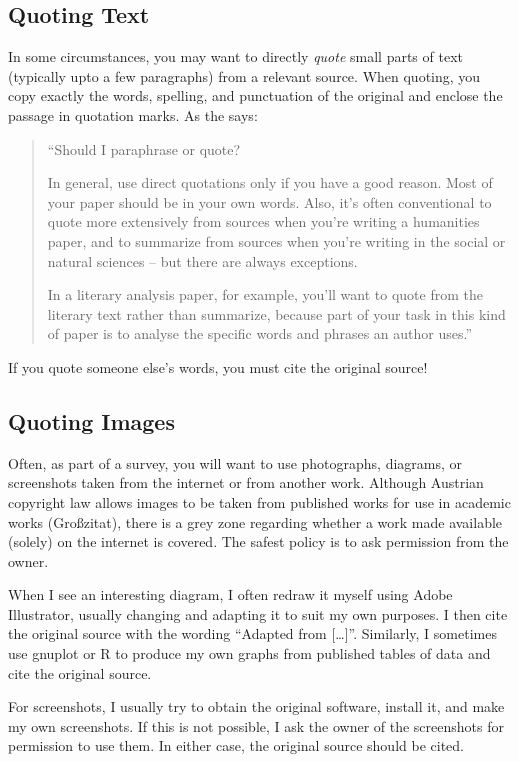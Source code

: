\subsection{Quoting Text}

In some circumstances, you may want to directly \emph{quote} small
parts of text (typically upto a few paragraphs) from a relevant
source. When quoting, you copy exactly the words, spelling, and
punctuation of the original and enclose the passage in quotation
marks. As the \citet{WisconsinGuide} says:
\begin{quotation}
\noindent
``Should I paraphrase or quote?

In general, use direct quotations only if you have a good reason. Most
of your paper should be in your own words. Also, it's often
conventional to quote more extensively from sources when you're
writing a humanities paper, and to summarize from sources when you're
writing in the social or natural sciences -- but there are always
exceptions.

In a literary analysis paper, for example, you'll want to quote from
the literary text rather than summarize, because part of your task in
this kind of paper is to analyse the specific words and phrases an
author uses.''
\end{quotation}
If you quote someone else's words, you must cite the original source!





\subsection{Quoting Images}

Often, as part of a survey, you will want to use photographs,
diagrams, or screenshots taken from the internet or from another
work. Although Austrian copyright law allows images to be taken from
published works for use in academic works (Großzitat), there is a grey
zone regarding whether a work made available (solely) on the internet
is covered. The safest policy is to ask permission from the owner.

When I see an interesting diagram, I often redraw it myself using
Adobe Illustrator, usually changing and adapting it to suit my own
purposes. I then cite the original source with the wording ``Adapted
from [\ldots]''. Similarly, I sometimes use gnuplot or R to produce my
own graphs from published tables of data and cite the original source.

For screenshots, I usually try to obtain the original software,
install it, and make my own screenshots. If this is not possible, I
ask the owner of the screenshots for permission to use them. In either
case, the original source should be cited.

